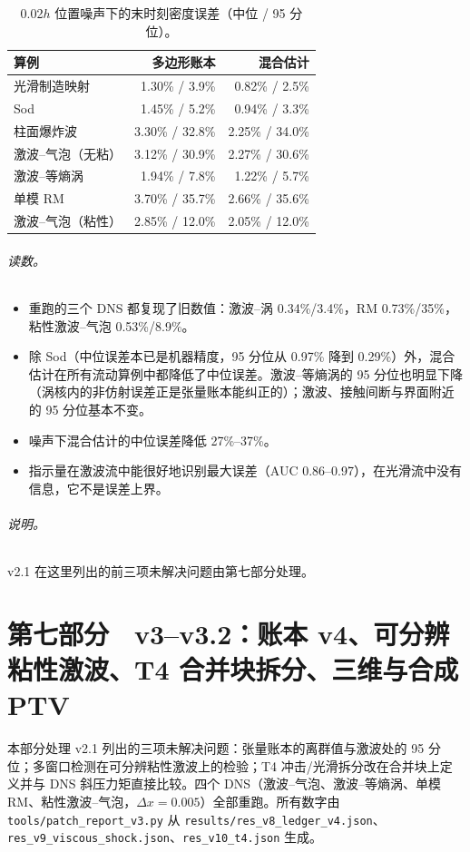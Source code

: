\begin{table}[!htbp]\centering\small\caption{0.02$h$ 位置噪声下的末时刻密度误差（中位 / 95 分位）。}
\begin{tabularx}{0.85\linewidth}{@{}L r r@{}}\toprule
算例 & 多边形账本 & 混合估计\\\midrule
光滑制造映射 & 1.30\% / 3.9\% & 0.82\% / 2.5\%\\
Sod & 1.45\% / 5.2\% & 0.94\% / 3.3\%\\
柱面爆炸波 & 3.30\% / 32.8\% & 2.25\% / 34.0\%\\
激波–气泡（无粘） & 3.12\% / 30.9\% & 2.27\% / 30.6\%\\
激波–等熵涡 & 1.94\% / 7.8\% & 1.22\% / 5.7\%\\
单模 RM & 3.70\% / 35.7\% & 2.66\% / 35.6\%\\
激波–气泡（粘性） & 2.85\% / 12.0\% & 2.05\% / 12.0\%\\
\bottomrule\end{tabularx}\end{table}
\paragraph{读数。}
\begin{itemize}
\item 重跑的三个 DNS 都复现了旧数值：激波–涡 0.34\%/3.4\%，RM 0.73\%/35\%，粘性激波–气泡 0.53\%/8.9\%。
\item 除 Sod（中位误差本已是机器精度，95 分位从 0.97\% 降到 0.29\%）外，混合估计在所有流动算例中都降低了中位误差。激波–等熵涡的 95 分位也明显下降（涡核内的非仿射误差正是张量账本能纠正的）；激波、接触间断与界面附近的 95 分位基本不变。
\item 噪声下混合估计的中位误差降低 27\%–37\%。
\item 指示量在激波流中能很好地识别最大误差（AUC 0.86–0.97），在光滑流中没有信息，它不是误差上界。
\end{itemize}

\paragraph{说明。}v2.1 在这里列出的前三项未解决问题由第七部分处理。

\clearpage\part{第七部分　v3–v3.2：账本 v4、可分辨粘性激波、T4 合并块拆分、三维与合成 PTV}

本部分处理 v2.1 列出的三项未解决问题：张量账本的离群值与激波处的 95 分位；多窗口检测在可分辨粘性激波上的检验；T4 冲击/光滑拆分改在合并块上定义并与 DNS 斜压力矩直接比较。四个 DNS（激波–气泡、激波–等熵涡、单模 RM、粘性激波–气泡，$\Delta x=0.005$）全部重跑。所有数字由 \texttt{tools/patch\_report\_v3.py} 从 \texttt{results/res\_v8\_ledger\_v4.json}、\texttt{res\_v9\_viscous\_shock.json}、\texttt{res\_v10\_t4.json} 生成。

